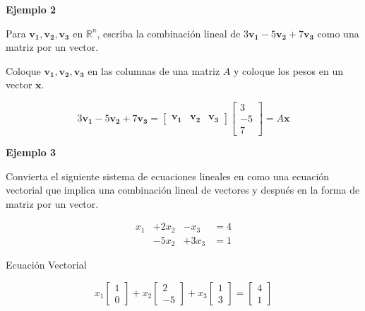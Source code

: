 \documentclass{article}
\begin{document}
\begin{large}
    \textbf{Ejemplo 2}
\end{large}

Para $\mathbf{v_1}, \mathbf{v_2}, \mathbf{v_3}$ en $\mathbb{R}^n$, escriba la combinación lineal de $3\mathbf{v_1} - 5\mathbf{v_2} + 7\mathbf{v_3}$ como una matriz por un vector.

Coloque $\mathbf{v_1}, \mathbf{v_2}, \mathbf{v_3}$ en las columnas de una matriz $A$ y coloque los pesos en un vector $\mathbf{x}$.

\begin{equation*}
    3\mathbf{v_1} - 5\mathbf{v_2} + 7\mathbf{v_3} = \begin{bmatrix}
        \mathbf{v_1} & \mathbf{v_2} & \mathbf{v_3}
    \end{bmatrix}
    \begin{bmatrix}
        3 \\-5\\7
    \end{bmatrix}
    = A\mathbf{x}
\end{equation*}

\begin{large}
    \textbf{Ejemplo 3}
\end{large}

Convierta el siguiente sistema de ecuaciones lineales en como una ecuación vectorial que implica una combinación lineal de vectores y después en la forma de matriz por un vector.

\begin{equation*}
    \begin{aligned}
        x_1 &+ 2x_2 &- x_3 &= 4\\
            &-5x_2  &+3x_3 &= 1
    \end{aligned}
\end{equation*}

Ecuación Vectorial

\begin{equation*}
    x_1\begin{bmatrix} 1\\0 \end{bmatrix} 
    +x_2\begin{bmatrix} 2\\-5 \end{bmatrix}
    +x_3\begin{bmatrix} 1\\3 \end{bmatrix}
    =\begin{bmatrix} 4\\1 \end{bmatrix}
\end{equation*}
\end{document}
